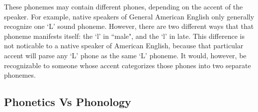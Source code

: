 These phonemes may contain different phones, depending on the accent of the speaker.  For example, native speakers of General American English only generally recognize one `L' sound phoneme. However, there are two different ways that that phoneme manifests itself: the `l' in ``male", and the `l' in late. This difference is not noticable to a native speaker of American English, because that particular accent will parse any `L' phone as the same `L' phoneme. It would, however, be recognizable to someone whose accent categorizes those phones into two separate phonemes.

\subsection{Phonetics Vs Phonology}
\label{vocab:phoneticsVsPhonemics}

